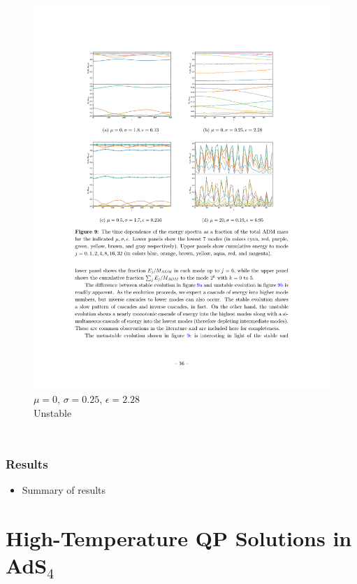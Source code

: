 \documentclass[mathserif,10pt]{beamer}
\newcommand{\bi}{\begin{itemize}}
\newcommand{\ei}{\end{itemize}}
\newcommand{\its}{\item}
\begin{document}
{\begin{columns}
\begin{figure}
      \includegraphics[width=\textwidth]{Em0w025} \\ $\mu = 0$, $\sigma = 0.25$, $\epsilon=2.28$ \\ Unstable
      \end{figure}
  \end{columns}
}
  
\frame
{
  \frametitle{Results}
  \bi
  \its Summary of results
  \ei
}  
  

\section{High-Temperature QP Solutions in AdS$_4$}
\end{document}
